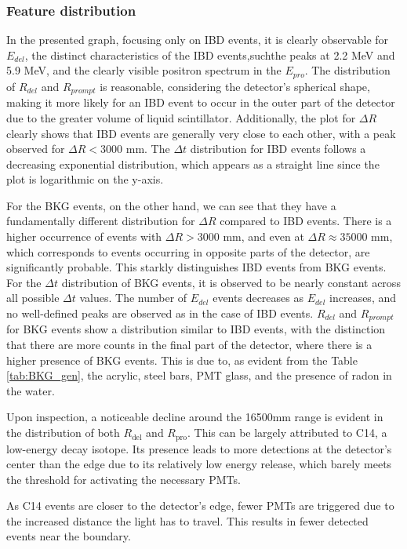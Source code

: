 \subsubsection*{Feature distribution}
In the presented graph, focusing only on IBD events, it is clearly observable for $E_{del}$, the distinct characteristics of the IBD events,suchthe peaks at 2.2 MeV and 5.9 MeV, and the clearly visible positron spectrum in the $E_{pro}$. The distribution of $R_{del}$ and $R_{prompt}$ is reasonable, considering the detector's spherical shape, making it more likely for an IBD event to occur in the outer part of the detector due to the greater volume of liquid scintillator. Additionally, the plot for \( \Delta R \) clearly shows that IBD events are generally very close to each other, with a peak observed for \( \Delta R < 3000 \) mm. The \( \Delta t \) distribution for IBD events follows a decreasing exponential distribution, which appears as a straight line since the plot is logarithmic on the y-axis.

For the BKG events, on the other hand, we can see that they have a fundamentally different distribution for \( \Delta R \) compared to IBD events. There is a higher occurrence of events with \( \Delta R > 3000 \) mm, and even at \( \Delta R \approx 35000 \) mm, which corresponds to events occurring in opposite parts of the detector, are significantly probable. This starkly distinguishes IBD events from BKG events. For the \( \Delta t \) distribution of BKG events, it is observed to be nearly constant across all possible \( \Delta t \) values. The number of \( E_{del} \) events decreases as \( E_{del} \) increases, and no well-defined peaks are observed as in the case of IBD events. \( R_{del} \) and \( R_{prompt} \) for BKG events show a distribution similar to IBD events, with the distinction that there are more counts in the final part of the detector, where there is a higher presence of BKG events. This is due to, as evident from the Table \ref{tab:BKG_gen}, the acrylic, steel bars, PMT glass, and the presence of radon in the water.

Upon inspection, a noticeable decline around the 16500mm range is evident in the distribution of both \(R_{\text{del}}\) and \(R_{\text{pro}}\). This can be largely attributed to C14, a low-energy decay isotope. Its presence leads to more detections at the detector's center than the edge due to its relatively low energy release, which barely meets the threshold for activating the necessary PMTs.

As C14 events are closer to the detector's edge, fewer PMTs are triggered due to the increased distance the light has to travel. This results in fewer detected events near the boundary.


